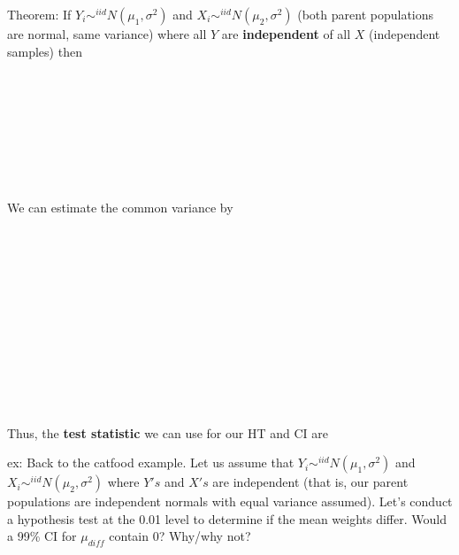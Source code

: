 Theorem:  If $Y_i\sim^{iid}N(\mu_1,\sigma^2)$ and $X_i\sim^{iid}N(\mu_2,\sigma^2)$ (both parent populations are normal, same variance) where all $Y$ are \textbf{independent} of all $X$ (independent samples) then\\~\\~\\~\\~\\~\\~\\~\\~\\
We can estimate the common variance by\\~\\~\\~\\~\\~\\~\\~\\~\\~\\~\\~\\~\\
Thus, the \textbf{test statistic} we can use for our HT and CI are

\newpage

ex:  Back to the catfood example.  Let us assume that $Y_i\sim^{iid}N(\mu_1,\sigma^2)$ and $X_i\sim^{iid}N(\mu_2,\sigma^2)$ where $Y's$ and $X's$ are independent (that is, our parent populations are independent normals with equal variance assumed).  Let's conduct a hypothesis test at the 0.01 level to determine if the mean weights differ.  Would a 99\% CI for $\mu_{diff}$ contain 0?  Why/why not?


